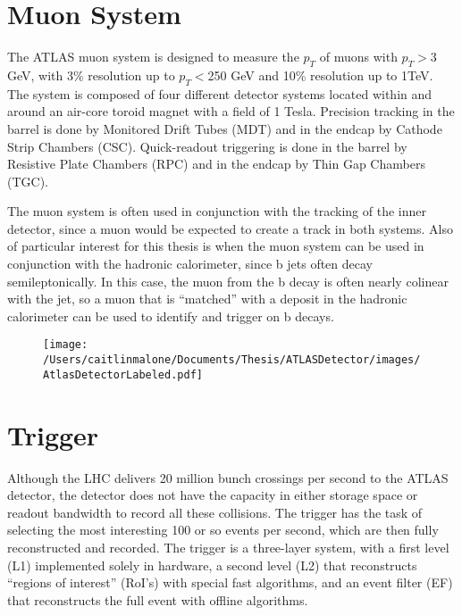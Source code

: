 \section{Muon System}
\label{sec:ms}
The ATLAS muon system is designed to measure the $p_T$ of muons with $p_T>$3 GeV, with 3\% resolution up to $p_T<$250 GeV and 10\% resolution up to 1TeV.  The system is composed of four different detector systems located within and around an air-core toroid magnet with a field of 1 Tesla.  Precision tracking in the barrel is done by Monitored Drift Tubes (MDT) and in the endcap by Cathode Strip Chambers (CSC).  Quick-readout triggering is done in the barrel by Resistive Plate Chambers (RPC) and in the endcap by Thin Gap Chambers (TGC).  

The muon system is often used in conjunction with the tracking of the inner detector, since a muon would be expected to create a track in both systems.  Also of particular interest for this thesis is when the muon system can be used in conjunction with the hadronic calorimeter, since b jets often decay semileptonically.  In this case, the muon from the b decay is often nearly colinear with the jet, so a muon that is ``matched'' with a deposit in the hadronic calorimeter can be used to identify and trigger on b decays.  

\begin{figure}
	\texttt{[image: /Users/caitlinmalone/Documents/Thesis/ATLASDetector/images/AtlasDetectorLabeled.pdf]}	\label{fig:detector}
\end{figure}

\section{Trigger}
\label{sec:atlas_trig}
Although the LHC delivers 20 million bunch crossings per second to the ATLAS detector, the detector does not have the capacity in either storage space or readout bandwidth to record all these collisions.  The trigger has the task of selecting the most interesting 100 or so events per second, which are then fully reconstructed and recorded.  The trigger is a three-layer system, with a first level (L1) implemented solely in hardware, a second level (L2) that reconstructs ``regions of interest'' (RoI's) with special fast algorithms, and an event filter (EF) that reconstructs the full event with offline algorithms.  
 

